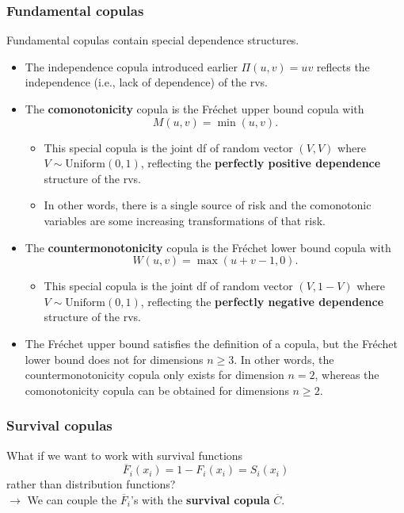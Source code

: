 \documentclass[11pt]{article}
\newcommand{\noi}{\noindent}
\begin{document}
\subsubsection{Fundamental copulas}
\noi Fundamental copulas contain special dependence structures.
\begin{itemize}
    \item The independence copula introduced earlier $\Pi(u,v)=uv$ reflects the independence (i.e., lack of dependence) of the rvs.
    \item The \textbf{comonotonicity} copula is the Fréchet upper bound copula with
    \[
        M(u,v)=\min(u,v).
    \]
    \begin{itemize}
        \item This special copula is the joint df of random vector $(V,V)$ where $V\sim\mathrm{Uniform}(0,1)$, reflecting the \textbf{perfectly positive dependence} structure of the rvs.
        \item In other words, there is a single source of risk and the comonotonic variables are some increasing transformations of that risk.
    \end{itemize}
    \item The \textbf{countermonotonicity} copula is the Fréchet lower bound copula with
    \[
        W(u,v)=\max(u+v-1,0).
    \]
    \begin{itemize}
        \item This special copula is the joint df of random vector $(V,1-V)$ where $V\sim\mathrm{Uniform}(0,1)$, reflecting the \textbf{perfectly negative dependence} structure of the rvs.
    \end{itemize}
    \item The Fréchet upper bound satisfies the definition of a copula, but the Fréchet lower bound does not for dimensions $n\ge3$. In other words, the countermonotonicity copula only exists for dimension $n=2$, whereas the comonotonicity copula can be obtained for dimensions $n\ge2$.
\end{itemize}

\subsubsection{Survival copulas}
\noi What if we want to work with survival functions
\[
\overline{F}_i(x_i)=1 - F_i(x_i)=S_i(x_i)
\]
rather than distribution functions?\\
$\to$ We can couple the $\overline{F}_i$’s with the \textbf{survival copula} $\overline{C}$.\\
\end{document}
